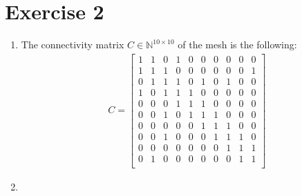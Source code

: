 \documentclass{article}
\begin{document}
\section{Exercise 2}
\begin{enumerate}[label=(\alph*)]

    \item The connectivity matrix $C\in\mathbb N^{10\times 10}$ of the mesh is the following:
    \begin{align*}
        C=\left[\begin{matrix}
            1 & 1 & 0 & 1 & 0 & 0 & 0 & 0 & 0 & 0\\
            1 & 1 & 1 & 0 & 0 & 0 & 0 & 0 & 0 & 1\\
            0 & 1 & 1 & 1 & 0 & 1 & 0 & 1 & 0 & 0\\
            1 & 0 & 1 & 1 & 1 & 0 & 0 & 0 & 0 & 0\\
            0 & 0 & 0 & 1 & 1 & 1 & 0 & 0 & 0 & 0\\
            0 & 0 & 1 & 0 & 1 & 1 & 1 & 0 & 0 & 0\\
            0 & 0 & 0 & 0 & 0 & 1 & 1 & 1 & 0 & 0\\
            0 & 0 & 1 & 0 & 0 & 0 & 1 & 1 & 1 & 0\\
            0 & 0 & 0 & 0 & 0 & 0 & 0 & 1 & 1 & 1\\
            0 & 1 & 0 & 0 & 0 & 0 & 0 & 0 & 1 & 1\\
        \end{matrix}\right]
    \end{align*}
\newpage
    \item 
    

\end{enumerate}
\end{document}
